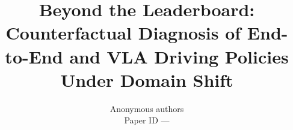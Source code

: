 \documentclass[letterpaper, 10pt, conference]{ieeeconf}
\begin{document}
\title{\LARGE \bf Beyond the Leaderboard: Counterfactual Diagnosis of End-to-End and VLA Driving Policies Under Domain Shift}
\newif\ifanon \anontrue
\ifanon
\author{Anonymous authors\\ Paper ID ---}
\else
\author{Ruolin Yang, Zilin Huang, Buoyue Wang, Zhengyang Wan, Yuhao Luo, Zihao Sheng, Sikai Chen*%
\thanks{This research was supported by the U.S. Department of Transportation (No.\ 69A3552348305) and by grants from NVIDIA utilizing NVIDIA RTX PRO 6000 Blackwell Max-Q Workstation Edition GPUs.}%
}
\fi
\maketitle
\thispagestyle{empty}
\pagestyle{empty}










\ifanon\else
\section*{Acknowledgment}
This research was supported by the U.S. Department of Transportation (No.\ 69A3552348305) and by grants from NVIDIA utilizing NVIDIA RTX PRO 6000 Blackwell Max-Q Workstation Edition GPUs.
\fi


\end{document}
